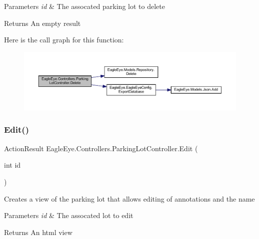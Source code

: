 \begin{DoxyParams}{Parameters}
{\em id} & The assocated parking lot to delete\\
\hline
\end{DoxyParams}
\begin{DoxyReturn}{Returns}
An empty result
\end{DoxyReturn}
Here is the call graph for this function\+:\nopagebreak
\begin{figure}[H]
\begin{center}
\leavevmode
\includegraphics[width=350pt]{class_eagle_eye_1_1_controllers_1_1_parking_lot_controller_aa26300d7c8f2fa2e41c15ceb0eb5c79e_cgraph}
\end{center}
\end{figure}
\mbox{\label{class_eagle_eye_1_1_controllers_1_1_parking_lot_controller_a4c61e3d4b7e032a616e0624bf79fbba8}} 
\subsubsection{\texorpdfstring{Edit()}{Edit()}}
{\footnotesize\ttfamily Action\+Result Eagle\+Eye.\+Controllers.\+Parking\+Lot\+Controller.\+Edit (\begin{DoxyParamCaption}\item[{int}]{id }\end{DoxyParamCaption})}



Creates a view of the parking lot that allows editing of annotations and the name 


\begin{DoxyParams}{Parameters}
{\em id} & The assocated lot to edit\\
\hline
\end{DoxyParams}
\begin{DoxyReturn}{Returns}
An html view
\end{DoxyReturn}
\mbox{\label{class_eagle_eye_1_1_controllers_1_1_parking_lot_controller_ab3bd9c4d1c40c73a214475198aa74039}} 

